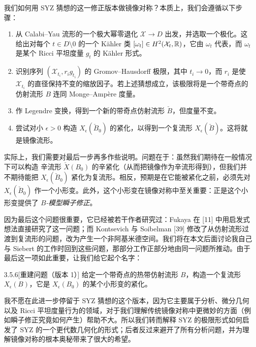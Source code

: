 我们如何用 SYZ 猜想的这一修正版本做镜像对称？本质上，我们会遵循以下步骤：

\begin{enumerate}
\item 从 Calabi--Yau 流形的一个极大幂零退化 $\mathcal{X}\to D$ 出发，并选取一个极化。这给出对每个 $t\in D\setminus0$ 的一个 Kähler 类 $[\omega_t]\in H^2(\mathcal{X}_t,\mathbb{R})$，它由 $\omega_t$ 代表，而 $\omega_t$ 是某个 Ricci 平坦度量 $g_t$ 的 Kähler 形式。
\item 识别序列 $(\mathcal{X}_{t_i},r_ig_{t_i})$ 的 Gromov--Hausdorff 极限，其中 $t_i\to0$，而 $r_i$ 是使 $\mathcal{X}_{t_i}$ 的直径保持不变的缩放因子。若上述猜想成立，该极限将是一个带奇点的仿射流形 $B$ 连同 Monge--Ampère 度量。
\item 作 Legendre 变换，得到一个新的带奇点仿射流形 $\check B$，但度量不变。
\item 尝试对小 $\epsilon>0$ 构造 $X_\epsilon(\check B_0)$ 的紧化，以得到一个复流形 $X_\epsilon(\check B)$。这将就是镜像流形。
\end{enumerate}

实际上，我们需要对最后一步再多作些说明。问题在于：虽然我们期待在一般情况下可以构造
辛流形 $\check X(B_0)$ 的辛紧化（从而把镜像作为辛流形得到），但我们并不期待能把 $X_\epsilon(\check B_0)$ 紧化为复流形。相反，预期是在它能被紧化之前，必须先对 $X_\epsilon(\check B_0)$ 作一个小形变。此外，这个小形变在镜像对称中至关重要：正是这个小形变提供了 \emph{$B$-模型瞬子修正}。


因为最后这个问题很重要，它已经被若干作者研究过：Fukaya 在 [11] 中用启发式想法直接研究了这一问题；而 Kontsevich 与 Soibelman [39] 修改了从仿射流形过渡到复流形的问题，改为产生一个非阿基米德空间。我们将在本文后面讨论我自己与 Siebert 的工作时回到这些问题，那部分工作正部分地由同一问题所推动。由于最后这一项如此重要，让我们给它起个名字：

\begin{question}{3.5.6}[重建问题（版本 1）]
给定一个带奇点的热带仿射流形 $B$，构造一个复流形 $X_\epsilon(B)$，它是 $X_\epsilon(B_0)$ 的某个小形变的紧化。
\end{question}

我不愿在此进一步停留于 SYZ 猜想的这个版本，因为它主要属于分析、微分几何以及 Ricci 平坦度量行为的领域，对于我们理解传统镜像对称中更微妙的方面（例如瞬子修正究竟如何产生）帮助不大。所以我们转而解释 SYZ 的极限形式如何启发了 SYZ 的一个更代数几何化的形式；后者反过来避开了所有分析问题，并为理解镜像对称的根本奥秘带来了很大的希望。

